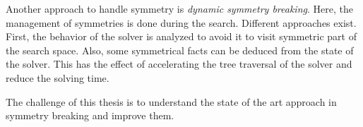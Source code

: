 Another approach to handle symmetry is \emph{dynamic symmetry breaking}. Here, the management of
symmetries is done during the search. Different approaches exist. First, the behavior of the solver is analyzed to avoid it to visit symmetric part of the search space. Also, some symmetrical facts can be deduced from the
state of the solver. This has the effect of accelerating the tree traversal of the solver and reduce the solving time.



The challenge of this thesis is to understand the state of  the art approach in symmetry breaking and
improve them.

%
%
%
%
%
%




